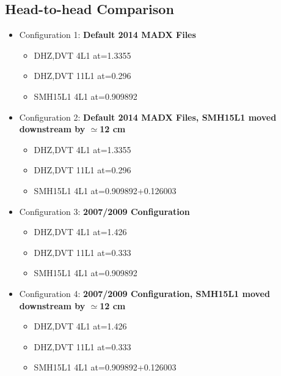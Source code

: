 \documentclass[11pt,letter,english]{article}
\begin{document}
\subsection*{Head-to-head Comparison}

\begin{itemize}

\item Configuration 1: {\bf Default 2014 MADX Files}
  \begin{itemize}
  \item DHZ,DVT 4L1 at=1.3355 
  \item DHZ,DVT 11L1 at=0.296 
  \item SMH15L1 4L1 at=0.909892 
  \end{itemize}
\item Configuration 2: {\bf Default 2014 MADX Files, SMH15L1 moved downstream by $\simeq$12 cm}
  \begin{itemize}
  \item DHZ,DVT 4L1 at=1.3355 
  \item DHZ,DVT 11L1 at=0.296 
  \item SMH15L1 4L1 at=0.909892+0.126003
  \end{itemize}

\item Configuration 3: {\bf 2007/2009 Configuration}
  \begin{itemize}
  \item DHZ,DVT 4L1 at=1.426 
  \item DHZ,DVT 11L1 at=0.333 
  \item SMH15L1 4L1 at=0.909892 
  \end{itemize}
\item Configuration 4: {\bf 2007/2009 Configuration, SMH15L1 moved downstream by $\simeq$12 cm}
  \begin{itemize}
  \item DHZ,DVT 4L1 at=1.426 
  \item DHZ,DVT 11L1 at=0.333 
  \item SMH15L1 4L1 at=0.909892+0.126003 
  \end{itemize}

\end{itemize}
\end{document}

